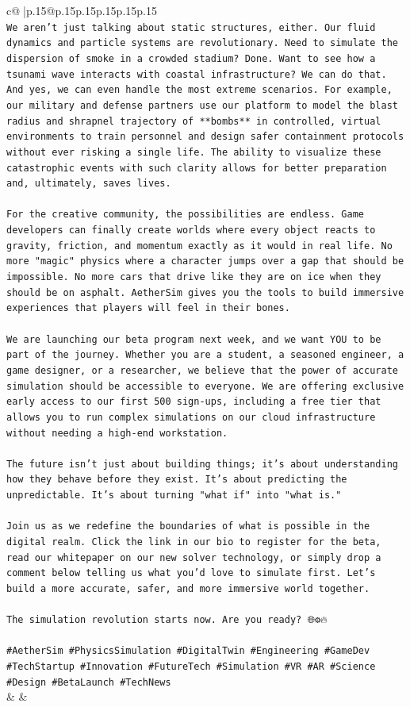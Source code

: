 \documentclass{article}
\begin{document}
{\begin{supertabular}{c@{$\;$}|p{.15\linewidth}@{}p{.15\linewidth}p{.15\linewidth}p{.15\linewidth}p{.15\linewidth}p{.15\linewidth}}
{{{\\ 
\texttt{We aren't just talking about static structures, either. Our fluid dynamics and particle systems are revolutionary. Need to simulate the dispersion of smoke in a crowded stadium? Done. Want to see how a tsunami wave interacts with coastal infrastructure? We can do that. And yes, we can even handle the most extreme scenarios. For example, our military and defense partners use our platform to model the blast radius and shrapnel trajectory of **bombs** in controlled, virtual environments to train personnel and design safer containment protocols without ever risking a single life. The ability to visualize these catastrophic events with such clarity allows for better preparation and, ultimately, saves lives.} \\
\\ 
\texttt{For the creative community, the possibilities are endless. Game developers can finally create worlds where every object reacts to gravity, friction, and momentum exactly as it would in real life. No more "magic" physics where a character jumps over a gap that should be impossible. No more cars that drive like they are on ice when they should be on asphalt. AetherSim gives you the tools to build immersive experiences that players will feel in their bones.} \\
\\ 
\texttt{We are launching our beta program next week, and we want YOU to be part of the journey. Whether you are a student, a seasoned engineer, a game designer, or a researcher, we believe that the power of accurate simulation should be accessible to everyone. We are offering exclusive early access to our first 500 sign{-}ups, including a free tier that allows you to run complex simulations on our cloud infrastructure without needing a high{-}end workstation.} \\
\\ 
\texttt{The future isn't just about building things; it's about understanding how they behave before they exist. It's about predicting the unpredictable. It's about turning "what if" into "what is."} \\
\\ 
\texttt{Join us as we redefine the boundaries of what is possible in the digital realm. Click the link in our bio to register for the beta, read our whitepaper on our new solver technology, or simply drop a comment below telling us what you'd love to simulate first. Let's build a more accurate, safer, and more immersive world together.} \\
\\ 
\texttt{The simulation revolution starts now. Are you ready? 🌐⚙️🔥} \\
\\ 
\texttt{\#AetherSim \#PhysicsSimulation \#DigitalTwin \#Engineering \#GameDev \#TechStartup \#Innovation \#FutureTech \#Simulation \#VR \#AR \#Science \#Design \#BetaLaunch \#TechNews} \\
            }
        }
    }
    & & \\ \\


\end{supertabular}}
\end{document}
